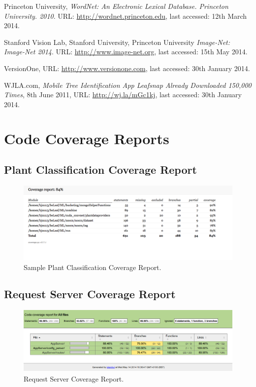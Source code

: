 \documentclass[a4paper,11pt]{article}
\begin{document}
\begin{description}
\begin{thebibliography}{1}
  Princeton University,
  \emph{WordNet: An Electronic Lexical Database. Princeton University. 2010}.
 URL: \url{http://wordnet.princeton.edu}, last accessed: 12th March 2014.

  Stanford Vision Lab, Stanford University, Princeton University
  \emph{Image-Net: Image-Net 2014}.
 URL: \url{http://www.image-net.org}, last accessed: 15th May 2014.

  VersionOne,
  URL: \url{http://www.versionone.com}, last accessed: 30th January 2014.

  WJLA.com, 
  \emph{Mobile Tree Identification App Leafsnap Already Downloaded 150,000 Times}, 8th June 2011,
 URL: \url{http://wj.la/mGc1kj}, last accessed: 30th January 2014.

 
\end{thebibliography}

\clearpage
\appendix

\section{Code Coverage Reports}

\subsection{Plant Classification Coverage Report}
\begin{figure}[h!]
	\centering
	\includegraphics[width=0.7\linewidth]{ml_coverage.png}
	\caption{Sample Plant Classification Coverage Report.}
\end{figure}

\subsection{Request Server Coverage Report}
\begin{figure}[h!]
	\centering
	\includegraphics[width=0.7\linewidth]{request_server_coverage.png}
	\caption{Request Server Coverage Report.}
\end{figure}


\end{description}
\end{document}
